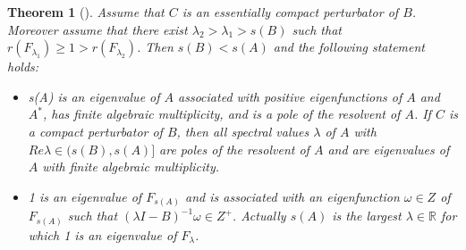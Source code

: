 \documentclass[11pt,reqno]{amsart}
\newtheorem{theorem}{Theorem}[section]
\numberwithin{equation}{section}
\begin{document}
\begin{theorem}[{\cite[Theorem 4.7]{Th1}}]\label{THM2.5}
Assume that $C$ is an essentially compact perturbator of $B$. Moreover assume that there exist $\lambda_{2}>\lambda_{1}>s(B)$ such that $r(F_{\lambda_{1}})\geq 1 >r(F_{\lambda_{2}})$. Then $s(B)<s(A)$ and the following statement holds:

\begin{itemize}[leftmargin=1cm]
\item [$(i)$] s(A) is an eigenvalue of $A$ associated with positive eigenfunctions of $A$ and $A^{*}$, has finite algebraic multiplicity, and is a pole of the resolvent of $A$. If $C$ is a compact perturbator of $B$, then all spectral values $\lambda$ of $A$ with $Re \lambda \in (s(B),s(A) ]$ are poles of the resolvent of $A$ and are eigenvalues of $A$ with finite algebraic multiplicity.

\item[$(ii)$] 1 is an eigenvalue of $F_{s(A)}$ and is associated with an eigenfunction $\omega \in Z$ of $F_{s(A)}$ such that $(\lambda I - B)^{-1}\omega \in Z^{+}$.
Actually $s(A)$ is the largest $\lambda \in \mathbb{R}$ for which 1 is an eigenvalue of $F_{\lambda}$.


\end{itemize}
\end{theorem}
\end{document}
